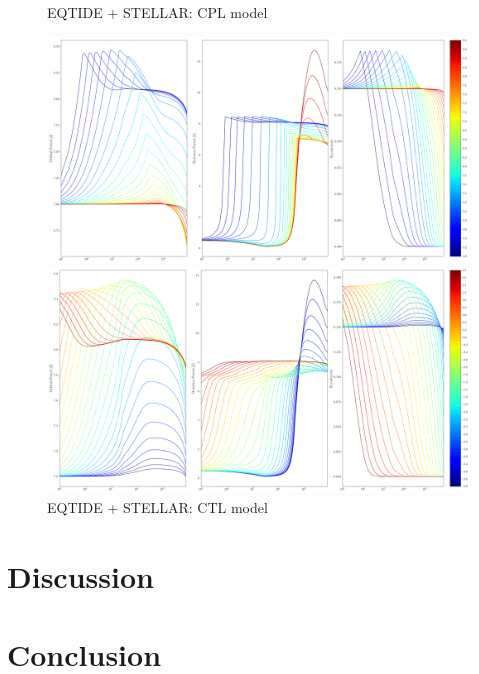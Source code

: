 \documentclass[]{aastex631}
\begin{document}
\begin{figure}[ht!]
\begin{center}
	\caption{EQTIDE + STELLAR: CPL model}
	\includegraphics[width=\linewidth]{../tests/cpl_stellar_eqtide/plots/vary_q_evolution.png} 
	\caption{EQTIDE + STELLAR: CTL model}
	\includegraphics[width=\linewidth]{../tests/ctl_stellar_eqtide/plots/vary_tau_evolution.png} 
\end{center}
\end{figure}

\section{Discussion} \label{sec:discusstion}



\section{Conclusion} \label{sec:conclusion}




\hfill \break %
\newpage
\appendix \label{sec:appendix}


{}

\end{document}
